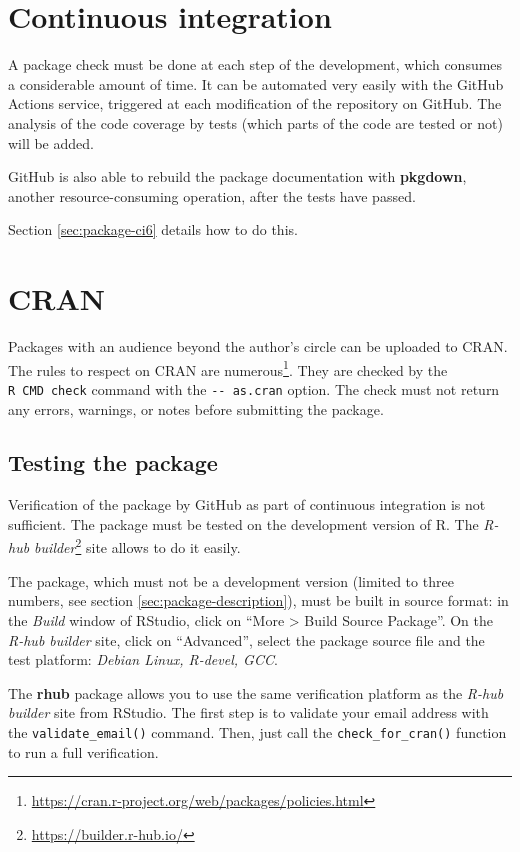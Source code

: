 \documentclass[
  12pt,
  american,
  a4paper,
  extrafontsizes,onecolumn,openright
  ]{memoir}
\begin{document}
\section{Continuous integration}\label{sec:package-ci5}

A package check must be done at each step of the development, which consumes a considerable amount of time.
It can be automated very easily with the GitHub Actions service, triggered at each modification of the repository on GitHub.
The analysis of the code coverage by tests (which parts of the code are tested or not) will be added.

GitHub is also able to rebuild the package documentation with \textbf{pkgdown}, another resource-consuming operation, after the tests have passed.

Section \ref{sec:package-ci6} details how to do this.

\section{CRAN}\label{sec:package-cran}

Packages with an audience beyond the author's circle can be uploaded to CRAN.
The rules to respect on CRAN are numerous\footnote{\url{https://cran.r-project.org/web/packages/policies.html}}. They are checked by the \texttt{R\ CMD\ check} command with the \texttt{-\/-\ as.cran} option.
The check must not return any errors, warnings, or notes before submitting the package.

\subsection{Testing the package}\label{testing-the-package}

Verification of the package by GitHub as part of continuous integration is not sufficient.
The package must be tested on the development version of R.
The \emph{R-hub builder}\footnote{\url{https://builder.r-hub.io/}} site allows to do it easily.

The package, which must not be a development version (limited to three numbers, see section \ref{sec:package-description}), must be built in source format: in the \emph{Build} window of RStudio, click on \enquote{More \textgreater{} Build Source Package}.
On the \emph{R-hub builder} site, click on \enquote{Advanced}, select the package source file and the test platform: \emph{Debian Linux, R-devel, GCC}.

The \textbf{rhub} package allows you to use the same verification platform as the \emph{R-hub builder} site from RStudio.
The first step is to validate your email address with the \texttt{validate\_email()} command.
Then, just call the \texttt{check\_for\_cran()} function to run a full verification.
\end{document}

